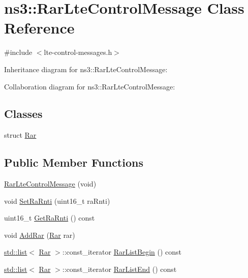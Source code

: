 \hypertarget{classns3_1_1RarLteControlMessage}{}\section{ns3\+:\+:Rar\+Lte\+Control\+Message Class Reference}
\label{classns3_1_1RarLteControlMessage}


{\ttfamily \#include $<$lte-\/control-\/messages.\+h$>$}



Inheritance diagram for ns3\+:\+:Rar\+Lte\+Control\+Message\+:


Collaboration diagram for ns3\+:\+:Rar\+Lte\+Control\+Message\+:
\subsection*{Classes}
\begin{DoxyCompactItemize}
\item 
struct \hyperlink{structns3_1_1RarLteControlMessage_1_1Rar}{Rar}
\end{DoxyCompactItemize}
\subsection*{Public Member Functions}
\begin{DoxyCompactItemize}
\item 
\hyperlink{classns3_1_1RarLteControlMessage_affe1bd4e4d8ab1f3fc90496d92899fb8}{Rar\+Lte\+Control\+Message} (void)
\item 
void \hyperlink{classns3_1_1RarLteControlMessage_ab9d740d34ac71b7fee73f546d3051a61}{Set\+Ra\+Rnti} (uint16\+\_\+t ra\+Rnti)
\item 
uint16\+\_\+t \hyperlink{classns3_1_1RarLteControlMessage_afc501100f1c370709916ab8986771ad7}{Get\+Ra\+Rnti} () const 
\item 
void \hyperlink{classns3_1_1RarLteControlMessage_ac085c1afd718c2f09800a427c6b29e7f}{Add\+Rar} (\hyperlink{structns3_1_1RarLteControlMessage_1_1Rar}{Rar} rar)
\item 
\hyperlink{openflow-interface_8h_afd9bcfa176617760671b67580f536fa7}{std\+::list}$<$ \hyperlink{structns3_1_1RarLteControlMessage_1_1Rar}{Rar} $>$\+::const\+\_\+iterator \hyperlink{classns3_1_1RarLteControlMessage_a7767e1f1e17b0bfbc48a58699298c58d}{Rar\+List\+Begin} () const 
\item 
\hyperlink{openflow-interface_8h_afd9bcfa176617760671b67580f536fa7}{std\+::list}$<$ \hyperlink{structns3_1_1RarLteControlMessage_1_1Rar}{Rar} $>$\+::const\+\_\+iterator \hyperlink{classns3_1_1RarLteControlMessage_a43ef39833bd3eb6f589d8eeb98051b84}{Rar\+List\+End} () const 
\end{DoxyCompactItemize}
